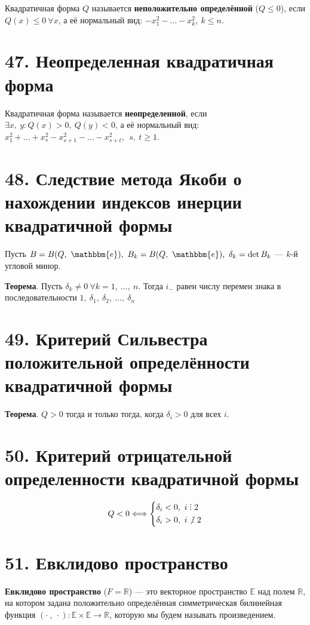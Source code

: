 \documentclass[a4paper, 12pt]{article}
\DeclareRobustCommand{\divby}{%
    \mathrel{\text{\vbox{\baselineskip.65ex\lineskiplimit0pt\hbox{.}\hbox{.}\hbox{.}}}}
}
\newcommand{\E}{\mathbb{E}}
\newcommand{\R}{\mathbb{R}}
\newcommand{\me}{\mathbbm{e}}
\begin{document}
Квадратичная форма $Q$ называется \textbf{неположительно определённой} ($Q \leqslant 0$), если $Q(x) \leqslant 0\ \forall x$, а её нормальный вид: $-x_1^2 - \ldots - x_k^2,\ k \leqslant n$.


\section*{47. Неопределенная квадратичная форма}
Квадратичная форма называется \textbf{неопределенной}, если $\exists x,\ y: Q(x) > 0,\ Q(y) < 0$, а её нормальный вид: $x_1^2 + \ldots + x_s^2 - x_{s + 1}^2 - \ldots - x_{s + t}^2,\ \ s,\ t \geqslant 1$.

\section*{48. Следствие метода Якоби о нахождении индексов инерции  квадратичной формы}
Пусть $B = B(Q,\ \me),\ B_k = B(Q,\ \me),\ \delta_k = \det B_k$ --- $k$-й угловой минор.

\textbf{Теорема}. Пусть $\delta_k \neq 0\ \forall k = 1,\ \ldots,\ n$. Тогда $i_-$ равен числу перемен знака в последовательности $1,\ \delta_1,\ \delta_2,\ \ldots,\ \delta_n$

\section*{49. Критерий Сильвестра положительной определённости квадратичной формы}
\textbf{Теорема}. $Q > 0$ тогда и только тогда, когда $\delta_i > 0$ для всех $i$.

\section*{50. Критерий отрицательной определенности квадратичной формы}
\vspace{-5mm}
\[Q < 0 \Longleftrightarrow
\begin{cases*}
\delta_i < 0,\ i \divby 2 \\
\delta_i > 0,\ i \not{\divby}\ 2
\end{cases*}
\]

\section*{51. Евклидово пространство}
\textbf{Евклидово пространство} ($F = \R$) --- это векторное пространство $\E$ над полем $\R$, на котором задана положительно определённая симметрическая билинейная функция $(\cdot\ ,\ \cdot): \E \times \E \rightarrow \R$, которую мы будем называть произведением.
\end{document}
